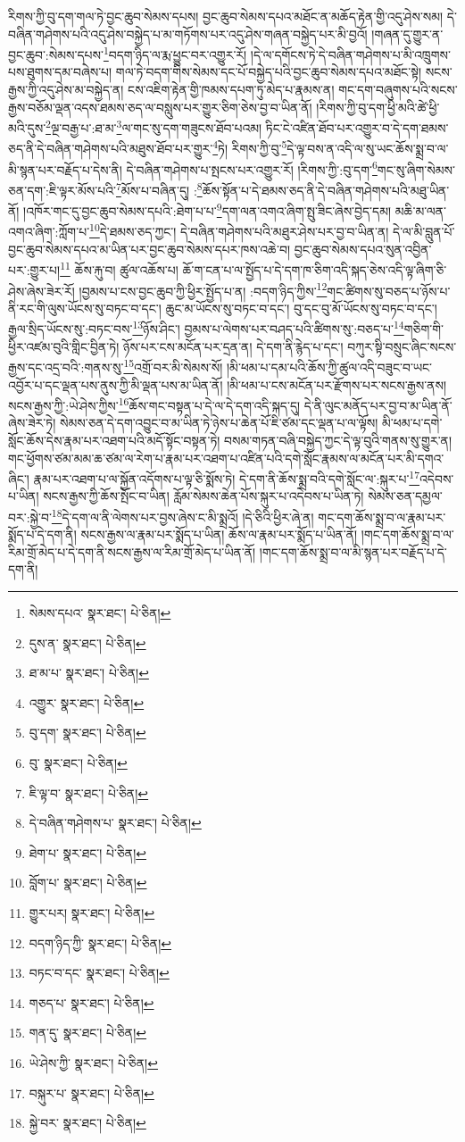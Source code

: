 རིགས་ཀྱི་བུ་དག་གལ་ཏེ་བྱང་ཆུབ་སེམས་དཔས། བྱང་ཆུབ་སེམས་དཔའ་མཐོང་ན་མཆོད་རྟེན་གྱི་འདུ་ཤེས་སམ། དེ་བཞིན་གཤེགས་པའི་འདུ་ཤེས་བསྐྱེད་པ་མ་གཏོགས་པར་འདུ་ཤེས་གཞན་བསྐྱེད་པར་མི་བྱའོ། །གཞན་དུ་གྱུར་ན་བྱང་ཆུབ་:སེམས་དཔས་\footnote{སེམས་དཔའ་  སྣར་ཐང་།  པེ་ཅིན། }བདག་ཉིད་ལ་རྨ་ཕྱུང་བར་འགྱུར་རོ། །དེ་ལ་དགོངས་ཏེ་དེ་བཞིན་གཤེགས་པ་མི་འཁྲུགས་པས་ཐུགས་དམ་བཞེས་པ། གལ་ཏེ་བདག་གིས་སེམས་དང་པོ་བསྐྱེད་པའི་བྱང་ཆུབ་སེམས་དཔའ་མཐོང་སྟེ། སངས་རྒྱས་ཀྱི་འདུ་ཤེས་མ་བསྐྱེད་ན། ངས་འཇིག་རྟེན་གྱི་ཁམས་དཔག་ཏུ་མེད་པ་རྣམས་ན། གང་དག་བཞུགས་པའི་སངས་རྒྱས་བཅོམ་ལྡན་འདས་ཐམས་ཅད་ལ་བསླུས་པར་གྱུར་ཅིག་ཅེས་བྱ་བ་ཡིན་ནོ། །རིགས་ཀྱི་བུ་དག་ཕྱི་མའི་ཚེ་ཕྱི་མའི་དུས་\footnote{དུས་ན་  སྣར་ཐང་།  པེ་ཅིན། }ལྔ་བརྒྱ་པ་:ཐ་མ་\footnote{ཐ་མ་པ་  སྣར་ཐང་།  པེ་ཅིན། }ལ་གང་སུ་དག་གཟུངས་ཐོབ་པའམ། ཏིང་ངེ་འཛིན་ཐོབ་པར་འགྱུར་བ་དེ་དག་ཐམས་ཅད་ནི་དེ་བཞིན་གཤེགས་པའི་མཐུས་ཐོབ་པར་གྱུར་\footnote{འགྱུར་  སྣར་ཐང་།  པེ་ཅིན། }ཏེ། རིགས་ཀྱི་བུ་\footnote{བུ་དག་  སྣར་ཐང་།  པེ་ཅིན། }དེ་ལྟ་བས་ན་འདི་ལ་སུ་ཡང་ཆོས་སྨྲ་བ་ལ་མི་སྙན་པར་བརྗོད་པ་དེས་ནི། དེ་བཞིན་གཤེགས་པ་སྤངས་པར་འགྱུར་རོ། །རིགས་ཀྱི་:བུ་དག་\footnote{བུ་  སྣར་ཐང་།  པེ་ཅིན། }གང་སུ་ཞིག་སེམས་ཅན་དག་:ཇི་ལྟར་མོས་པའི་\footnote{ཇི་ལྟ་བ་  སྣར་ཐང་།  པེ་ཅིན། }མོས་པ་བཞིན་དུ། :\footnote{དེ་བཞིན་གཤེགས་པ་  སྣར་ཐང་།  པེ་ཅིན། }ཆོས་སྟོན་པ་དེ་ཐམས་ཅད་ནི་དེ་བཞིན་གཤེགས་པའི་མཐུ་ཡིན་ནོ། །འཁོར་གང་དུ་བྱང་ཆུབ་སེམས་དཔའི་:ཐེག་པ་པ་\footnote{ཐེག་པ་  སྣར་ཐང་།  པེ་ཅིན། }དག་ལན་འགའ་ཞིག་སྤུ་ཟིང་ཞེས་བྱེད་དམ། མཆི་མ་ལན་འགའ་ཞིག་:ཀློག་པ་\footnote{བློག་པ་  སྣར་ཐང་།  པེ་ཅིན། }དེ་ཐམས་ཅད་ཀྱང་། དེ་བཞིན་གཤེགས་པའི་མཐུར་ཤེས་པར་བྱ་བ་ཡིན་ན། དེ་ལ་མི་བླུན་པོ་བྱང་ཆུབ་སེམས་དཔའ་མ་ཡིན་པར་བྱང་ཆུབ་སེམས་དཔར་ཁས་འཆེ་བ། བྱང་ཆུབ་སེམས་དཔའ་སུན་འབྱིན་པར་:གྱུར་པ།\footnote{གྱུར་པར།  སྣར་ཐང་།  པེ་ཅིན། } ཆོས་རྐུ་བ། ཚུལ་འཆོས་པ། ཆོ་ག་ངན་པ་ལ་སྤྱོད་པ་དེ་དག་ཁ་ཅིག་འདི་སྐད་ཅེས་འདི་ལྟ་ཞིག་ཅི་ཤེས་ཞེས་ཟེར་རོ། །བྱམས་པ་ངས་བྱང་ཆུབ་ཀྱི་ཕྱིར་སྤྱོད་པ་ན། :བདག་ཉིད་ཀྱིས་\footnote{བདག་ཉིད་ཀྱི་  སྣར་ཐང་།  པེ་ཅིན། }གང་ཚིགས་སུ་བཅད་པ་ཉོས་པ་ནི་རང་གི་ལུས་ཡོངས་སུ་བཏང་བ་དང་། ཆུང་མ་ཡོངས་སུ་བཏང་བ་དང་། བུ་དང་བུ་མོ་ཡོངས་སུ་བཏང་བ་དང་། རྒྱལ་སྲིད་ཡོངས་སུ་:བཏང་བས་\footnote{བཏང་བ་དང་  སྣར་ཐང་།  པེ་ཅིན། }ཉོས་ཤིང་། བྱམས་པ་ལེགས་པར་བཤད་པའི་ཚིགས་སུ་:བཅད་པ་\footnote{གཅད་པ་  སྣར་ཐང་།  པེ་ཅིན། }གཅིག་གི་ཕྱིར་འཛམ་བུའི་གླིང་བྱིན་ཏེ། ཉོས་པར་ངས་མངོན་པར་དྲན་ན། དེ་དག་ནི་རྙེད་པ་དང་། བཀུར་སྟི་བསྲུང་ཞིང་སངས་རྒྱས་དང་འདྲ་བའི་:གནས་སུ་\footnote{གན་དུ་  སྣར་ཐང་།  པེ་ཅིན། }འགྲོ་བར་མི་སེམས་སོ། །མི་ཕམ་པ་དམ་པའི་ཆོས་ཀྱི་ཚུལ་འདི་བཟུང་བ་ཡང་འབྱོར་པ་དང་ལྡན་པས་ནུས་ཀྱི་མི་ལྡན་པས་མ་ཡིན་ནོ། །མི་ཕམ་པ་ངས་མངོན་པར་རྫོགས་པར་སངས་རྒྱས་ནས། སངས་རྒྱས་ཀྱི་:ཡེ་ཤེས་ཀྱིས་\footnote{ཡེ་ཤེས་ཀྱི་  སྣར་ཐང་།  པེ་ཅིན། }ཆོས་གང་བསྟན་པ་དེ་ལ་དེ་དག་འདི་སྐད་དུ། དེ་ནི་ལུང་མནོད་པར་བྱ་བ་མ་ཡིན་ནོ་ཞེས་ཟེར་ཏེ། སེམས་ཅན་དེ་དག་འབྱུང་བ་མ་ཡིན་ཏེ་ཉེས་པ་ཆེན་པོ་ཇི་ཙམ་དང་ལྡན་པ་ལ་ལྟོས། མི་ཕམ་པ་དགེ་སློང་ཆོས་དེས་རྣམ་པར་འཐག་པའི་མདོ་སྟོང་བསྟན་ཏེ། བསམ་གཏན་བཞི་བསྐྱེད་ཀྱང་དེ་ལྟ་བུའི་གནས་སུ་གྱུར་ན། གང་ཕྱོགས་ཙམ་མམ་ཆ་ཙམ་ལ་རེག་པ་རྣམ་པར་འཐག་པ་འཛིན་པའི་དགེ་སློང་རྣམས་ལ་མངོན་པར་མི་དགའ་ཞིང་། རྣམ་པར་འཐག་པ་ལ་སྐྱོན་འདོགས་པ་ལྟ་ཅི་སྨོས་ཏེ། དེ་དག་ནི་ཆོས་སྨྲ་བའི་དགེ་སློང་ལ་:སྐུར་པ་\footnote{བསྐུར་པ་  སྣར་ཐང་།  པེ་ཅིན། }འདེབས་པ་ཡིན། སངས་རྒྱས་ཀྱི་ཆོས་སྤོང་བ་ཡིན། རློམ་སེམས་ཆེན་པོས་སྐུར་པ་འདེབས་པ་ཡིན་ཏེ། སེམས་ཅན་དམྱལ་བར་:སྐྱེ་བ་\footnote{སྐྱེ་བར་  སྣར་ཐང་།  པེ་ཅིན། }དེ་དག་ལ་ནི་ལེགས་པར་བྱས་ཞེས་ང་མི་སྨྲའོ། །དེ་ཅིའི་ཕྱིར་ཞེ་ན། གང་དག་ཆོས་སྨྲ་བ་ལ་རྣམ་པར་སྨོད་པ་དེ་དག་ནི། སངས་རྒྱས་ལ་རྣམ་པར་སྨོད་པ་ཡིན། ཆོས་ལ་རྣམ་པར་སྨོད་པ་ཡིན་ནོ། །གང་དག་ཆོས་སྨྲ་བ་ལ་རིམ་གྲོ་མེད་པ་དེ་དག་ནི་སངས་རྒྱས་ལ་རིམ་གྲོ་མེད་པ་ཡིན་ནོ། །གང་དག་ཆོས་སྨྲ་བ་ལ་མི་སྙན་པར་བརྗོད་པ་དེ་དག་ནི། 